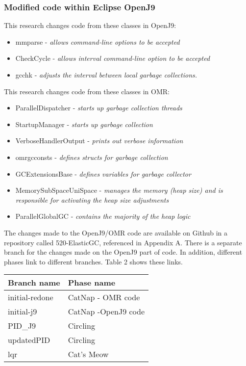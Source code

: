 \subsubsection{Modified code within Eclipse OpenJ9}
This research changes code from these classes in OpenJ9:
\begin{itemize}
\item
  mmparse - \emph{allows command-line options to be accepted}
\item
  CheckCycle - \emph{allows interval command-line option to be
  accepted}
\item
  gcchk - \emph{adjusts the interval between local garbage collections.}
\end{itemize}
This research changes code from these classes in OMR:
\begin{itemize}
\item
 ParallelDispatcher - \emph{starts up garbage collection threads}
\item
StartupManager - \emph{starts up garbage collection}
\item
VerboseHandlerOutput - \emph{prints out verbose information}
\item
omrgcconsts - \emph{defines structs for garbage collection}
\item
 GCExtensionsBase - \emph{defines variables for garbage collector}
\item
 MemorySubSpaceUniSpace - \emph{manages the memory (heap size) and
  is responsible for activating the heap size adjustments}
\item
ParallelGlobalGC - \emph{contains the majority of the heap logic}
\end{itemize}

The changes made to the OpenJ9/OMR code are available on Github in a repository called 520-ElasticGC, referenced in Appendix A. There is a separate branch for the changes made on the OpenJ9 part of code. In addition, different phases link to different branches. Table 2 shows these links.
\begin{center}
\begin{tabular}{|m{4cm}|m{4cm}|}
\hline
\textbf{Branch name} & \textbf{Phase name}\tabularnewline
\hline
initial-redone & CatNap - OMR code\tabularnewline
\hline
initial-j9 & CatNap -OpenJ9 code\tabularnewline
\hline

PID\_J9 & Circling\tabularnewline
\hline

updatedPID & Circling\tabularnewline
\hline

lqr & Cat's Meow \tabularnewline
\hline

\end{tabular}
\end{center}
